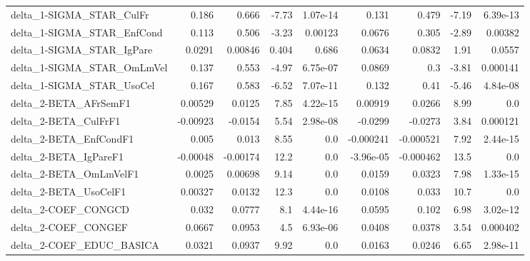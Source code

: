 \begin{tabular}{lrrrrrrrr}
delta\_1-SIGMA\_STAR\_CulFr              &       0.186 &        0.666 &    -7.73 & 1.07e-14 &      0.131 &       0.479 &        -7.19 &      6.39e-13 \\
delta\_1-SIGMA\_STAR\_EnfCond            &       0.113 &        0.506 &    -3.23 &  0.00123 &     0.0676 &       0.305 &        -2.89 &       0.00382 \\
delta\_1-SIGMA\_STAR\_IgPare             &      0.0291 &      0.00846 &    0.404 &    0.686 &     0.0634 &      0.0832 &         1.91 &        0.0557 \\
delta\_1-SIGMA\_STAR\_OmLmVel            &       0.137 &        0.553 &    -4.97 & 6.75e-07 &     0.0869 &         0.3 &        -3.81 &      0.000141 \\
delta\_1-SIGMA\_STAR\_UsoCel             &       0.167 &        0.583 &    -6.52 & 7.07e-11 &      0.132 &        0.41 &        -5.46 &      4.84e-08 \\
delta\_2-BETA\_AFrSemF1                 &     0.00529 &       0.0125 &     7.85 & 4.22e-15 &    0.00919 &      0.0266 &         8.99 &           0.0 \\
delta\_2-BETA\_CulFrF1                  &    -0.00923 &      -0.0154 &     5.54 & 2.98e-08 &    -0.0299 &     -0.0273 &         3.84 &      0.000121 \\
delta\_2-BETA\_EnfCondF1                &       0.005 &        0.013 &     8.55 &      0.0 &  -0.000241 &   -0.000521 &         7.92 &      2.44e-15 \\
delta\_2-BETA\_IgPareF1                 &    -0.00048 &     -0.00174 &     12.2 &      0.0 &  -3.96e-05 &   -0.000462 &         13.5 &           0.0 \\
delta\_2-BETA\_OmLmVelF1                &      0.0025 &      0.00698 &     9.14 &      0.0 &     0.0159 &      0.0323 &         7.98 &      1.33e-15 \\
delta\_2-BETA\_UsoCelF1                 &     0.00327 &       0.0132 &     12.3 &      0.0 &     0.0108 &       0.033 &         10.7 &           0.0 \\
delta\_2-COEF\_CONGCD                   &       0.032 &       0.0777 &      8.1 & 4.44e-16 &     0.0595 &       0.102 &         6.98 &      3.02e-12 \\
delta\_2-COEF\_CONGEF                   &      0.0667 &       0.0953 &      4.5 & 6.93e-06 &     0.0408 &      0.0378 &         3.54 &      0.000402 \\
delta\_2-COEF\_EDUC\_BASICA              &      0.0321 &       0.0937 &     9.92 &      0.0 &     0.0163 &      0.0246 &         6.65 &      2.98e-11 \\

\end{tabular}
